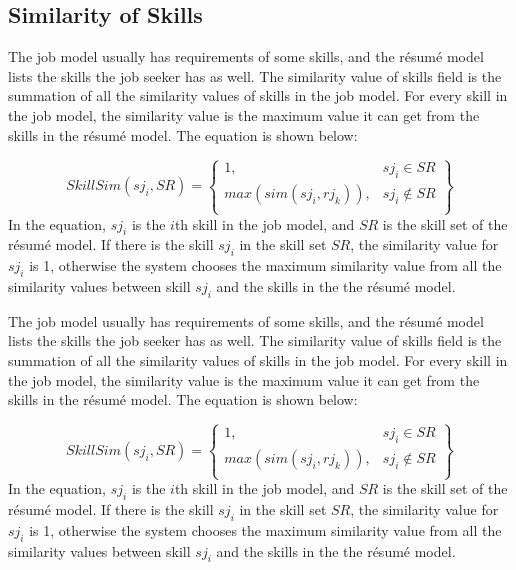 \subsection{Similarity of Skills}

The job model usually has requirements of some skills, and the r\'esum\'e model lists the skills the job seeker has as well. The similarity value of skills field is the summation of all the similarity values of skills in the job model. For every skill in the job model, the similarity value is the maximum value it can get from the skills in the r\'esum\'e model. The equation is shown below:

$$ SkillSim(sj_i,SR ) = \begin{Bmatrix}
1, & sj_i \in SR  \\
max( sim (sj_i, rj_k )), & sj_i \notin SR \\
\end{Bmatrix} $$
In the equation, $sj_i$ is the $i$th skill in the job model, and $SR$ is the skill set of the r\'esum\'e model. If there is the skill $sj_i$ in the skill set $SR$, the similarity value for $sj_i$ is 1, otherwise the system chooses the maximum similarity value from all the similarity values between skill $sj_i$ and the skills in the the r\'esum\'e model.

The job model usually has requirements of some skills, and the r\'esum\'e model lists the skills the job seeker has as well. The similarity value of skills field is the summation of all the similarity values of skills in the job model. For every skill in the job model, the similarity value is the maximum value it can get from the skills in the r\'esum\'e model. The equation is shown below:

$$ SkillSim(sj_i,SR ) = \begin{Bmatrix}
1, & sj_i \in SR  \\
max( sim (sj_i, rj_k )), & sj_i \notin SR \\
\end{Bmatrix} $$
In the equation, $sj_i$ is the $i$th skill in the job model, and $SR$ is the skill set of the r\'esum\'e model. If there is the skill $sj_i$ in the skill set $SR$, the similarity value for $sj_i$ is 1, otherwise the system chooses the maximum similarity value from all the similarity values between skill $sj_i$ and the skills in the the r\'esum\'e model.
